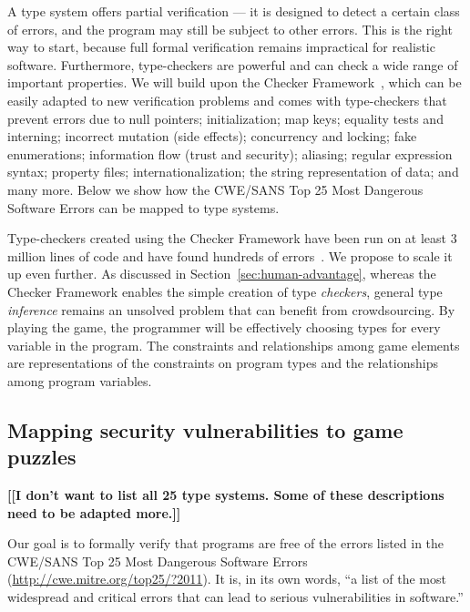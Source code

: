 \documentclass{sig-alternate}
\newcommand{\todo}[1]{{\color{red}\bfseries [[#1]]}}
\begin{document}
A type system offers partial verification --- it is designed to detect
a certain class of errors, and the program may still be subject to
other errors.  This is the right way to start, because full formal
verification remains impractical for realistic software.  Furthermore,
type-checkers are powerful and can check a wide range of important
properties.  We will build upon the Checker
Framework~\cite{PapiACPE2008,DietlDEMS2011,checker-framework-website-20100203},
which can be easily adapted to new verification problems and comes
with type-checkers that prevent errors due to null pointers;
initialization; map keys; equality tests and interning; incorrect
mutation (side effects); concurrency and locking; fake enumerations;
information flow (trust and security); aliasing; regular expression
syntax; property files; internationalization; the string
representation of data; and many more.  Below we show how the CWE/SANS
Top 25 Most Dangerous Software Errors can be mapped to type systems.

Type-checkers created using the Checker Framework have been run on at
least 3 million lines of code and have found hundreds of
errors~\cite{PapiACPE2008,DietlDEMS2011}.  We propose to scale it up
even further.  As discussed in Section~\ref{sec:human-advantage},
whereas the Checker Framework enables the simple creation of type
\emph{checkers}, general type \emph{inference} remains an unsolved
problem that can benefit from crowdsourcing.
By playing the game, the programmer will be effectively choosing types for
every variable in the program.  The constraints and relationships among
game elements are representations of the constraints on program types and
the relationships among program variables.


\subsection{Mapping security vulnerabilities to game puzzles}
\label{sec:cwe-sans}

\todo{I don't want to list all 25 type systems. Some of these
  descriptions need to be adapted more.}

Our goal is to formally verify that programs are free of the errors
listed in the CWE/SANS Top 25 Most Dangerous Software Errors
(\url{http://cwe.mitre.org/top25/?2011}).  It is, in its own words,
``a list of the most widespread and critical errors that can lead to
serious vulnerabilities in software.''
\end{document}
